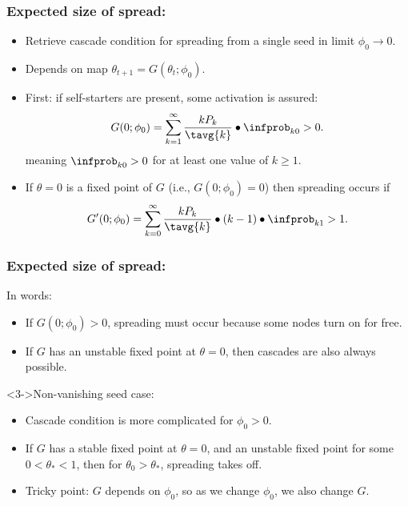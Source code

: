 \begin{frame}
  \frametitle{Expected size of spread:}

  \begin{block}{}
    \begin{itemize}
    \item<1->
      Retrieve cascade condition for 
      spreading from a single seed in limit $\phi_0 \rightarrow 0$.
    \item<2-> 
      Depends on map $\theta_{t+1} = G(\theta_{t};\phi_0)$.
    \item<3-> 
      First: if self-starters are present, some activation is assured:
      $$
      G(0;\phi_0) = 
      \sum_{k=1}^{\infty} 
      \frac{kP_k}{\tavg{k}}
      \bullet
      \infprob_{k0} > 0.
      $$
      meaning $\infprob_{k0}>0$ for at least one value of $k \ge 1$.
    \item<4-> 
      If $\theta=0$ is a fixed point of $G$ (i.e., $G(0;\phi_0) = 0$)
      then spreading occurs if
      $$
      G'(0;\phi_0) = 
      \sum_{k=0}^{\infty} 
      \frac{k P_k}{\tavg{k}}
      \bullet
      (k-1) 
      \bullet
      \infprob_{k1} > 1.
      $$
    \end{itemize}
  \end{block}

\end{frame}

\begin{frame}
  \frametitle{Expected size of spread:}

  \begin{block}{In words:}    
    \begin{itemize}
    \item<1-> 
      If $G(0;\phi_0) > 0$, spreading must occur because
      some nodes turn on for free.
    \item<2-> 
      If $G$ has an \alert{unstable fixed point} at $\theta = 0$,
      then cascades are also always possible.
    \end{itemize}
  \end{block}

  \begin{block}<3->{Non-vanishing seed case:}
    \begin{itemize}
    \item<3-> 
      Cascade condition is more complicated for
      $\phi_0 > 0$.
    \item<4-> 
      If $G$ has a \alert{stable fixed point} at $\theta = 0$,
      and an \alert{unstable fixed point} for some $0 < \theta_\ast < 1$,
      then for $\theta_0  > \theta_\ast$, spreading takes off.
    \item<5->
      Tricky point: $G$ depends on $\phi_0$, so as we change
      $\phi_0$, we also change $G$.
    \end{itemize}
  \end{block}

\end{frame}

